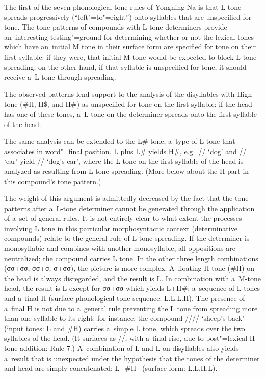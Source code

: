 The first of the seven phonological tone rules of Yongning Na is that L tone spreads progressively (“left"=to"=right”) onto syllables that are unspecified
for tone. The tone patterns of compounds with L-tone determiners provide an~interesting
testing"=ground for determining whether or not the lexical tones which have an~initial M tone in their surface
form are specified for tone on their first syllable: if they were, that initial M tone would
be expected to block L-tone spreading; on the other hand, if that syllable is unspecified for tone,
it should receive a~L tone through spreading.

The observed patterns lend support to the analysis of the disyllables with High tone (\#H, H\$, and
H\#) as unspecified for tone on the first syllable: if the head has one of these tones, a~L tone on
the determiner spreads onto the first syllable of the head. 

The same analysis can be extended to the L\# tone, a~type of L tone that associates in word"=final position. L plus L\# yields H\#,
e.g.~// ‘dog’ and // ‘ear’ yield // ‘dog’s ear’, where
the L tone on the first syllable of the head is analyzed as resulting from L-tone spreading. (More
below about the H part in this compound's tone pattern.)

The weight of this argument is admittedly decreased by the fact that the tone patterns after
a~L-tone determiner cannot be generated through the application of a~set of general rules. It is not
entirely clear to what extent the processes involving L tone in this particular morphosyntactic context
(determinative compounds) relate to the general rule of L-tone spreading. If the determiner is
monosyllabic and combines with another monosyllable, all oppositions are neutralized; the compound
carries L tone. In the other three length combinations (σσ+σσ, σσ+σ, σ+σσ), the picture is more
complex. A~floating H tone (\#H) on the head is always disregarded, and the result is L. In
combination with a~M-tone head, the result is L except for σσ+σσ which yields L+H\#: a~sequence of L
tones and a~final H (surface phonological tone sequence: L.L.L.H). The presence of a~final H is not due to a~general rule preventing the
L tone from spreading more than one syllable to its right: for instance, the compound
//// ‘sheep’s back’ (input tones: L and \#H) carries a~simple L tone, which spreads over the two syllables of
the head. (It surfaces as //, with a~final rise, due to post"=lexical H-tone
addition: Rule 7.) A~combination of L and L on disyllables also yields a~result that is unexpected under
the hypothesis that the tones of the determiner and head are simply concatenated: L+\#H-- (surface
form: L.L.H.L).

